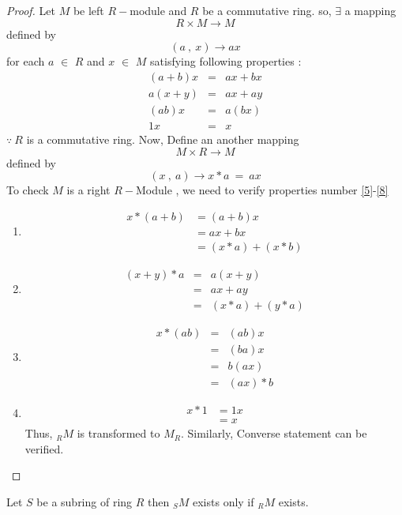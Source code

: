 \begin{proof} Let $M$ be left $R-$module and $R$ be a commutative ring. \newline
	so, $\exists$ a mapping
\begin{equation*}
R \times M \rightarrow M
\end{equation*}	
defined by 
\begin{equation*}
(a \ , \ x) \rightarrow ax  
\end{equation*}
for each $a$ $\in$ $R$ and $x$ $\in$ $M$ satisfying following properties :
\begin{eqnarray*}
(a+b) x &=& ax + bx \\ a(x+y) &=& ax + ay \\ (ab)x &=& a(bx) \\ 1x &=& x
\end{eqnarray*}
$\because \ R$ is a commutative ring.\newline
Now, Define an another mapping
 \begin{equation*}
 M \times R \rightarrow M
 \end{equation*}	
 defined by 
 \begin{equation*}
 (x \ ,\ a) \rightarrow x*a \ = \ ax  
 \end{equation*}
To check $M$ is a right $R-$Module , we need to verify properties number \eqref{5}-\eqref{8}
 \begin{enumerate}
 	\item 
 	\begin{align*}
 		x*(a+b) &= (a+b)x \\ &= ax + bx \\ &= (x*a) + (x*b)
 	\end{align*}
 	\item \begin{eqnarray*}
 		(x+y)*a &=& a(x+y) \\ &=& ax + ay \\ &=& (x*a) + (y*a)
 	      \end{eqnarray*}
       \item \begin{eqnarray*}
       x*(ab) &=& (ab)x \\ &=& (ba)x \\ &=& b(ax) \\ &=& (ax)*b
       \end{eqnarray*} 
   \item \begin{eqnarray*}
   x*1 &= 1x \\  &= x
   \end{eqnarray*}
Thus, $_{R}M$ is transformed to $M_R$.\newline
Similarly, Converse statement can be verified.
\end{enumerate}
\end{proof} \bigskip
\begin{remark}
	Let $S$ be a subring of ring $R$ then $_{S}M$ exists   only if $_{R}M$ exists.
\end{remark} 

      
       
 	
 

